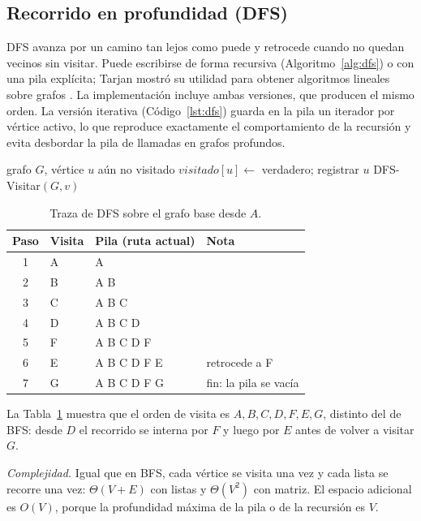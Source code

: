 \documentclass[conference]{IEEEtran}
\begin{document}
\subsection{Recorrido en profundidad (DFS)}
DFS avanza por un camino tan lejos como puede y retrocede cuando no quedan vecinos sin visitar. Puede escribirse de forma recursiva (Algoritmo~\ref{alg:dfs}) o con una pila explícita; Tarjan mostró su utilidad para obtener algoritmos lineales sobre grafos \cite{tarjan72}. La implementación incluye ambas versiones, que producen el mismo orden. La versión iterativa (Código~\ref{lst:dfs}) guarda en la pila un iterador por vértice activo, lo que reproduce exactamente el comportamiento de la recursión y evita desbordar la pila de llamadas en grafos profundos.

\begin{algorithm}[t]
\caption{DFS-Visitar$(G,u)$}
\label{alg:dfs}
\begin{algorithmic}[1]
\Require grafo $G$, vértice $u$ aún no visitado
\State $visitado[u]\gets$ verdadero; registrar $u$
    \State DFS-Visitar$(G,v)$
  \EndIf
\EndFor
\end{algorithmic}
\end{algorithm}

\begin{table}[t]
\caption{Traza de DFS sobre el grafo base desde $A$.}
\label{tab:dfs}
\centering
\footnotesize
\setlength{\tabcolsep}{4pt}
\begin{tabular}{@{}cllp{3.0cm}@{}}
\toprule
Paso & Visita & Pila (ruta actual) & Nota \\
\midrule
1 & A & A &  \\
2 & B & A B &  \\
3 & C & A B C &  \\
4 & D & A B C D &  \\
5 & F & A B C D F &  \\
6 & E & A B C D F E & retrocede a F \\
7 & G & A B C D F G & fin: la pila se vacía \\
\bottomrule
\end{tabular}
\end{table}

La Tabla~\ref{tab:dfs} muestra que el orden de visita es $A,B,C,D,F,E,G$, distinto del de BFS: desde $D$ el recorrido se interna por $F$ y luego por $E$ antes de volver a visitar $G$.

\emph{Complejidad.} Igual que en BFS, cada vértice se visita una vez y cada lista se recorre una vez: $\Theta(V+E)$ con listas y $\Theta(V^2)$ con matriz. El espacio adicional es $O(V)$, porque la profundidad máxima de la pila o de la recursión es $V$.
\end{document}
